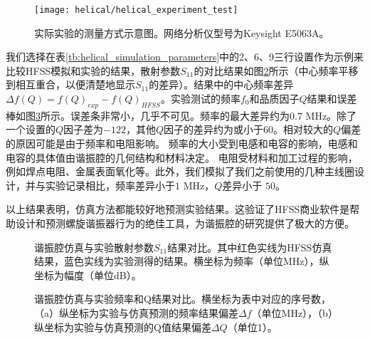 \begin{figure}
    \centering
    \caption[实际实验的测量方式示意图]{实际实验的测量方式示意图。网络分析仪型号为Keysight E5063A。\label{fig:helical_experiment_test}}
    \texttt{[image: helical/helical\_experiment\_test]}
\end{figure}

我们选择在表\ref{tb:helical_simulation_parameters}中的2、6、9三行设置作为示例来比较HFSS模拟和实验的结果，散射参数$S_{11}$的对比结果如图\ref{fig:helical_compares}所示（中心频率平移到相互重合，以便清楚地显示$S_{11}$的差异）。结果中的中心频率差异$\Delta f(Q)=f(Q)_{exp}-f(Q)_{HFSS}$。实验测试的频率$f_0$和品质因子$Q$结果和误差棒如图\ref{fig:helical_compares_f_q}所示。误差条非常小，几乎不可见。频率的最大差异约为$0.7$ MHz。除了一个设置的$Q$因子差为$-122$，其他$Q$因子的差异约为或小于$60$。相对较大的$Q$偏差的原因可能是由于频率和电阻影响。
频率的大小受到电感和电容的影响，电感和电容的具体值由谐振腔的几何结构和材料决定。
电阻受材料和加工过程的影响，例如焊点电阻、金属表面氧化等。此外，我们模拟了我们之前使用的几种主线圈设计，并与实验记录相比，频率差异小于$1$ MHz，$Q$差异小于 $50$。

以上结果表明，仿真方法都能较好地预测实验结果。这验证了HFSS商业软件是帮助设计和预测螺旋谐振器行为的绝佳工具，为谐振腔的研究提供了极大的方便。

\begin{figure}
    \centering
    \caption[谐振腔仿真与实验散射参数结果对比]{谐振腔仿真与实验散射参数$S_{11}$结果对比。其中红色实线为HFSS仿真结果，蓝色实线为实验测得的结果。横坐标为频率（单位MHz），纵坐标为幅度（单位dB）。\label{fig:helical_compares}}
\end{figure}


\begin{figure}
    \centering
    \caption[谐振腔仿真与实验频率和Q结果对比]{谐振腔仿真与实验频率和Q结果对比。横坐标为表中对应的序号数，（a）纵坐标为实验与仿真预测的频率结果偏差$\Delta f$（单位MHz），（b）纵坐标为实验与仿真预测的Q值结果偏差$\Delta Q$（单位1）。\label{fig:helical_compares_f_q}}
\end{figure}

